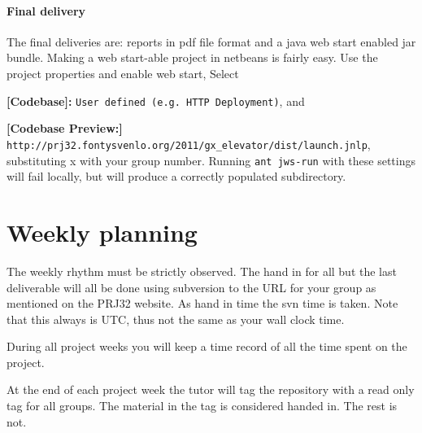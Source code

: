 \paragraph{Final delivery} The final deliveries are: reports in pdf file format and a java
web start enabled jar bundle. Making a web start-able project in netbeans is fairly easy. 
Use the project properties and enable web start, Select
\begin{Itemize}
\item \textbf{[Codebase]:}  \texttt{User defined (e.g. HTTP Deployment)}, and
\item \textbf{[Codebase Preview:]}  \texttt{\scriptsize
    http://prj32.fontysvenlo.org/2011/gx\_elevator/dist/launch.jnlp},
  substituting x with your group number. Running \texttt{ant jws-run}
  with these settings will fail locally, but will produce a correctly populated
   subdirectory.
\end{Itemize}


\section{Weekly planning}
The weekly rhythm must be strictly observed. The hand in for all but
the last deliverable will all be done using subversion to the URL
for your group as mentioned on the PRJ32 website. As hand in time the
svn time is taken. Note that this always is UTC, thus not the same as
your wall clock time.

During all project weeks you will keep a time record of all
the time spent on the project.

At the end of each project week the tutor will tag the repository with
a read only tag for all groups. The material in the tag is considered
handed in. The rest is not.

